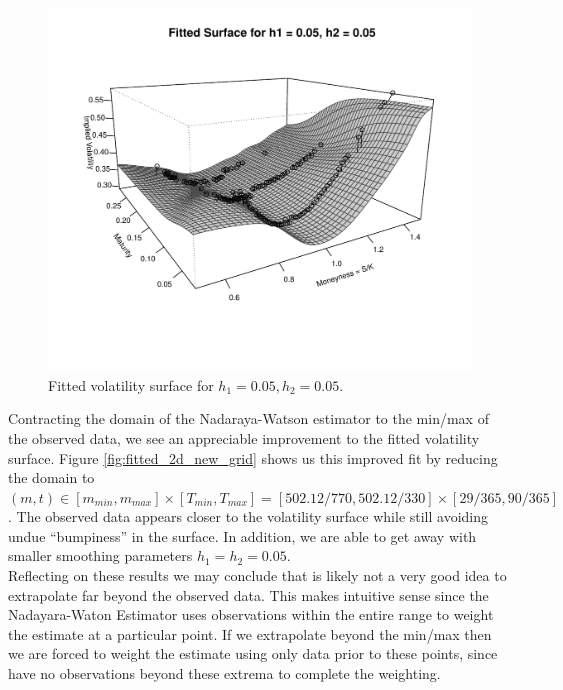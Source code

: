 \documentclass[11pt]{article}
\newlength\tindent
\renewcommand{\indent}{\hspace*{\tindent}}
\begin{document}
\begin{figure}[H]
	\centering
 	\includegraphics[scale=0.75]{../plots/q2/fitted_2d_005_005.pdf}
\caption{Fitted volatility surface for $h_1 = 0.05, h_2 = 0.05$.}
\label{fig:fitted_2d_005_005}
\end{figure}

\indent Contracting the domain of the Nadaraya-Watson estimator to the min/max of the observed data, we see an appreciable improvement to the fitted volatility surface. Figure \ref{fig:fitted_2d_new_grid} shows us this improved fit by reducing the domain to $(m,t) \in [m_{min}, m_{max}]\times[T_{min},T_{max}] = [502.12/770, 502.12/330]\times[29/365,90/365]$. The observed data appears closer to the volatility surface while still avoiding undue ``bumpiness'' in the surface. In addition, we are able to get away with smaller smoothing parameters $h_1 = h_2 = 0.05$. \\

\indent Reflecting on these results we may conclude that is likely not a very good idea to extrapolate far beyond the observed data. This makes intuitive sense since the Nadayara-Waton Estimator uses observations within the entire range to weight the estimate at a particular point. If we extrapolate beyond the min/max then we are forced to weight the estimate using only data prior to these points, since have no observations beyond these extrema to complete the weighting.
\end{document}
